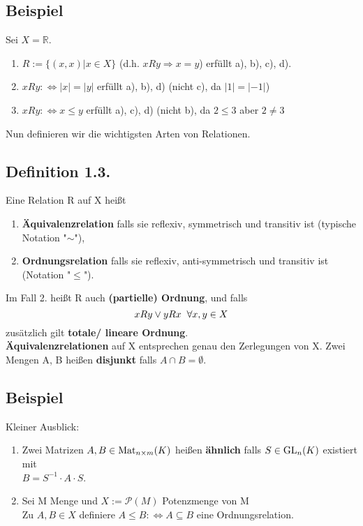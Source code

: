 \documentclass[a4paper, 12pt]{extarticle}
\newcommand{\tn}[1]{\textnormal {#1}}
\begin{document}
\subsection*{Beispiel} 
Sei $X = \mathbb R$.
\begin{enumerate}[label=(\alph*)]
\item $ R:=\{(x,x) | x\in X\}$ (d.h. $xRy \Rightarrow x=y$) erfüllt a), b), c), d).
\item $ xRy :\Leftrightarrow |x|=|y|$ erfüllt a), b), d) (nicht c), da $|1|=|-1|$)
\item $ xRy :\Leftrightarrow x\leq y$ erfüllt a), c), d) (nicht b), da $2\leq 3$ aber $2 \neq 3$
\end{enumerate}
Nun definieren wir die wichtigsten Arten von Relationen.

\subsection*{Definition 1.3.}
Eine Relation R auf X heißt
\begin{enumerate}[label=(\arabic*)]
\item \textbf{Äquivalenzrelation} falls sie reflexiv, symmetrisch und transitiv ist (typische Notation "$\sim$"),
\item \textbf{Ordnungsrelation} falls sie reflexiv, anti-symmetrisch und transitiv ist (Notation "$\leq$").
\end{enumerate}
Im Fall 2. heißt R auch \textbf{(partielle) Ordnung}, und falls 
$$ xRy \lor yRx \hspace*{2mm} \forall x,y \in X$$
zusätzlich gilt \textbf{totale/ lineare Ordnung}.\\
\textbf{Äquivalenzrelationen} auf X entsprechen genau den Zerlegungen von X.
Zwei Mengen A, B heißen \textbf{disjunkt} falls $A \cap B = \emptyset$.

\subsection*{Beispiel}
Kleiner Ausblick:
\begin{enumerate}[label=(\alph*)]
\item Zwei Matrizen $A,B \in \tn{Mat}_{n{\times}m}(K)$ heißen \textbf{ähnlich} falls $S \in \tn{GL}_n(K)$ existiert mit \\$B=S^{-1}{\cdot}A{\cdot}S$.
\item Sei M Menge und $X:=\mathcal P(M)$ Potenzmenge von M\\
 Zu $A,B \in X$ definiere $A\leq B :\Leftrightarrow A\subseteq B$ eine Ordnungsrelation.
\end{enumerate}
\end{document}
